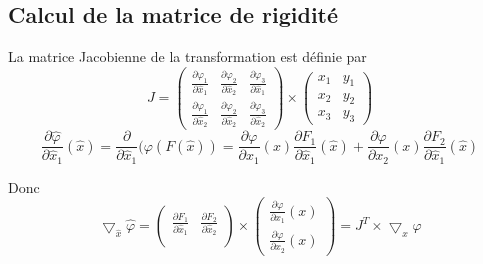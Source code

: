 \documentclass[a4paper,12pt,titlepage]{report}
\begin{document}
\begin{onehalfspace}

\begin{appendix}

\chapter{Calcul de la matrice de rigidité}
\label{annexe_1}

La matrice Jacobienne de la transformation est définie par
\[	
J =
\begin{pmatrix}
  \frac{\partial\varphi_{1}}{\partial \hat{x}_{1}} & \frac{\partial\varphi_{2}}{\partial \hat{x}_{2}}  & \frac{\partial\varphi_{3}}{\partial \hat{x}_{1}}\\ 
  \frac{\partial\varphi_{1}}{\partial \hat{x}_{2}} & \frac{\partial \varphi_{2}}{\partial \hat{x}_{2}} & \frac{\partial\varphi_{3}}{\partial \hat{x}_{2}} 
\end{pmatrix} 
\times
\begin{pmatrix}
   x_{1} &  y_{1} \\
   x_{2} &  y_{2} \\
   x_{3} &  y_{3}
\end{pmatrix}
\]
\[
\frac{\partial \hat{\varphi}}{\partial \hat{x}_{1}}(\hat{x}) = 
\frac{\partial}{\partial \hat{x}_{1}}(\varphi(F(\hat{x})) = 
\frac{\partial \varphi}{\partial x_{1}}(x) \frac{\partial F_{1}}{\partial \hat{x}_{1}}(\hat{x}) +
\frac{\partial \varphi}{\partial x_{2}}(x) \frac{\partial F_{2}}{\partial \hat{x}_{1}}(\hat{x})
\]

Donc
\[ \bigtriangledown_{\hat{x}} \hat{\varphi} = 
\begin{pmatrix}
   \frac{\partial F_{1}}{\partial \hat{x}_{1}} & \frac{\partial F_{2}}{\partial \hat{x}_{2}}\\
\end{pmatrix}
\times 
\begin{pmatrix}
   \frac{\partial \varphi}{\partial x_{1}}(x) \\
   \frac{\partial\varphi}{\partial x_{2}}(x)
\end{pmatrix} = 
J^{T} \times \bigtriangledown_{x} \varphi \]


\end{appendix}
\end{onehalfspace}
\end{document}
